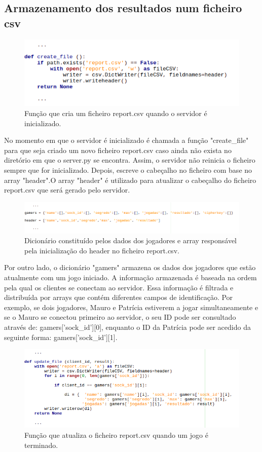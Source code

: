 \documentclass{report}
\begin{document}
\subsection{Armazenamento dos resultados num ficheiro csv}
\begin{figure}[H]
        \centering
        \includegraphics[scale=0.65]{create_file}       
        \caption{Função que cria um ficheiro report.csv quando o servidor é inicializado.}
\end{figure}
No momento em que o servidor é inicializado é chamada a função "create\_file" para que seja criado um novo ficheiro report.csv caso ainda não exista no diretório em que o server.py se encontra. Assim, o servidor não reinicia o ficheiro sempre que for inicializado. Depois, escreve o cabeçalho no ficheiro com base no array "header".O array "header" é utilizado para atualizar o cabeçalho do ficheiro report.csv que será gerado pelo servidor.
\begin{figure}[H]
        \centering
        \includegraphics[scale=0.65]{dicionarioearray_server}   
        \caption{Dicionário constituído pelos dados dos jogadores e array responsável pela inicialização do header no ficheiro report.csv.}
\end{figure}
Por outro lado, o dicionário "gamers" armazena os dados dos jogadores que estão atualmente com um jogo iniciado. A informação armazenada é baseada na ordem pela qual os clientes se conectam ao servidor. Essa informação é filtrada e distribuída por arrays que contém diferentes campos de identificação. Por exemplo, se dois jogadores, Mauro e Patrícia estiverem a jogar simultaneamente e se o Mauro se conectou primeiro ao servidor, o seu ID pode ser consultado através de: gamers['sock\_id'][0], enquanto o ID da Patrícia pode ser acedido da seguinte forma: gamers['sock\_id'][1].

\begin{figure}[H]
        \centering
        \includegraphics[scale=0.65]{update_file}       
        \caption{Função que atualiza o ficheiro report.csv quando um jogo é terminado.}
\end{figure}
\end{document}
